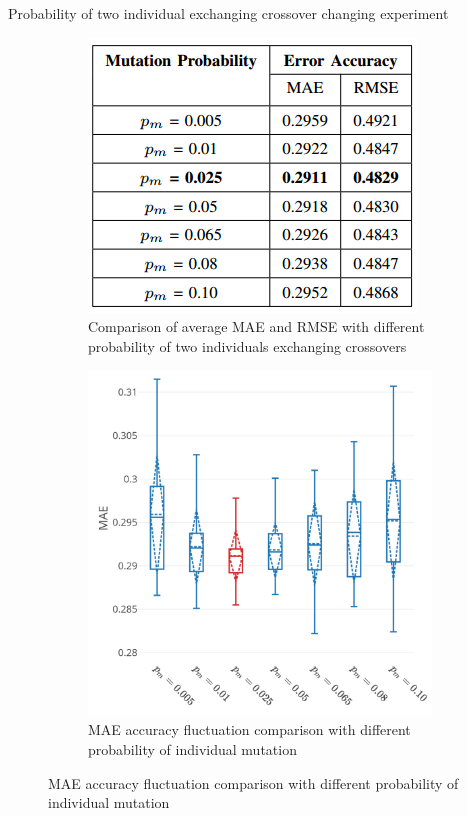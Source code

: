 \documentclass{beamer}
\newcommand{\notesize}{\fontsize{8}{10}\selectfont}
\begin{document}
\begin{frame}{Probability of two individual exchanging crossover changing experiment}
	\begin{figure}
		\centering
		\begin{subfigure}{0.4\textwidth}
			\centering
			\includegraphics[width=1.0\linewidth]{pm_changing.png}
			\caption*{\notesize Comparison of average MAE and RMSE with different probability of two individuals exchanging crossovers}
			\label{fig:sub11}
		\end{subfigure}%
		\begin{subfigure}{.6\textwidth}
			\centering
			\includegraphics[width=0.8\linewidth]{tn2_multi_cpu_best_pm.pdf}
			\caption*{\notesize MAE accuracy fluctuation comparison with different probability of individual mutation}
			\label{fig:sub21}
		\end{subfigure}%
		\label{fig:cpu_predict}
	\end{figure}
\end{frame}
\end{document}

